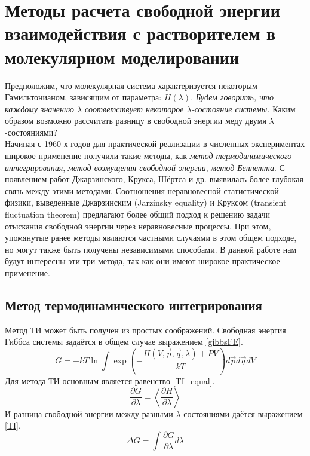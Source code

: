\section{Методы расчета свободной энергии взаимодействия с растворителем в молекулярном моделировании}

Предположим, что молекулярная система характеризуется некоторым Гамильтонианом, зависящим от параметра: $H(\lambda)$. \textit{Будем говорить, что каждому значению $\lambda$ соответствует некоторое $\lambda$-состояние системы.} Каким образом возможно рассчитать разницу в свободной энергии меду двумя $\lambda$-состояниями?\\

Начиная с 1960-х годов для практической реализации в численных экспериментах широкое применение получили такие методы, как \textit{метод термодинамического интегрирования}, \textit{метод возмущения свободной энергии}, \textit{метод Беннетта}. С появлением работ  Джарзинского, Крукса, Шёртса и др. \cite{jarzinski,crooks,stanford_ben} выявилась более глубокая связь между этими методами. Соотношения неравновесной статистической физики, выведенные Джарзинским (Jarzinsky equality) и Круксом (transient fluctuation theorem) предлагают более общий подход к решению задачи отыскания свободной энергии через неравновесные процессы. При этом, упомянутые ранее методы являются частными случаями в этом общем подходе, но могут также быть получены независимыми способами.
В данной работе нам будут интересны эти три метода, так как они имеют широкое практическое применение.
\subsection{Метод термодинамического интегрирования}
Метод ТИ может быть получен из простых соображений. Свободная энергия Гиббса системы задаётся в общем случае выражением \ref{gibbsFE}.
\begin{equation}
G=-kT\ln\int \exp\left(-\frac{H(V,\vec{p},\vec{q},\lambda)+PV}{kT}\right)d\vec{p}d\vec{q}dV
\label{gibbsFE}
\end{equation}
Для метода ТИ основным является равенство \ref{TI_equal}.
\begin{equation}
\frac{\partial G}{\partial \lambda}=\left\langle \frac{\partial H}{\partial \lambda} \right\rangle
\label{TI_equal}
\end{equation}
И разница свободной энергии между разными $\lambda$-состояниями даётся выражением \ref{TI}.
\begin{equation}
\Delta G=\int \frac{\partial G}{\partial \lambda} d\lambda
\label{TI}
\end{equation}

